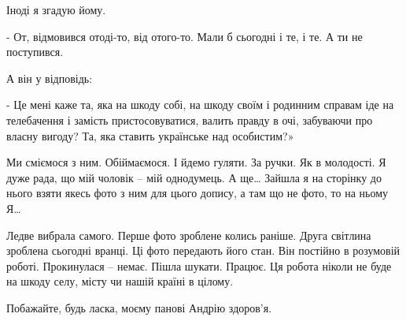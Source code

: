 Іноді я згадую йому. 

- От, відмовився отоді-то, від отого-то. Мали б сьогодні і те, і те. А ти не поступився. 

А він у відповідь:

- Це мені каже та, яка на шкоду собі, на шкоду своїм і родинним  справам іде на
телебачення і замість пристосовуватися, валить правду в очі, забуваючи про
власну вигоду? Та, яка ставить українське над особистим?»

Ми сміємося з ним. Обіймаємося. І йдемо гуляти. За ручки. Як в молодості. Я
дуже рада, що мій чоловік – мій однодумець. А ще… Зайшла я на сторінку до нього
взяти якесь фото з ним для цього допису, а там що не фото, то на ньому Я… 

Ледве вибрала самого. Перше фото зроблене колись раніше. Друга світлина
зроблена сьогодні вранці. Ці фото передають його стан. Він постійно в розумовій
роботі. Прокинулася – немає. Пішла шукати. Працює. Ця робота ніколи не буде на
шкоду селу, місту чи нашій країні в цілому.  

Побажайте, будь ласка, моєму панові Андрію здоров’я.

